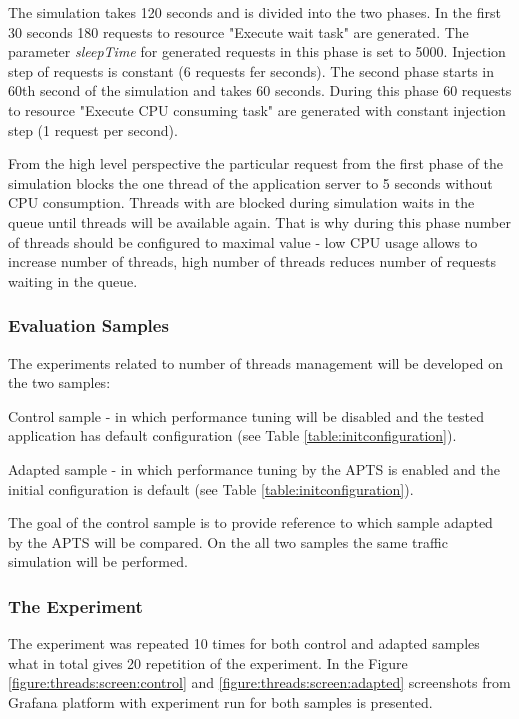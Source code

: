 \documentclass[10pt,a4paper]{article}
\let\tempone\itemize
\let\temptwo\enditemize
\renewenvironment{itemize}{\tempone\addtolength{\itemsep}{-0.4\baselineskip}}{\temptwo}
\begin{document}
The simulation takes 120 seconds and is divided into the two phases. In the first 30 seconds 180 requests to resource "Execute wait task" are generated. The parameter \textit{sleepTime} for generated requests in this phase is set to 5000. Injection step of requests is constant (6 requests fer seconds). The second phase starts in 60th second of the simulation and takes 60 seconds. During this phase 60 requests to resource "Execute CPU consuming task" are generated with constant injection step (1 request per second). 

From the high level perspective the particular request from the first phase of the simulation blocks the one thread of the application server to 5 seconds without CPU consumption. Threads with are blocked during simulation waits in the queue until threads will be available again. That is why during this phase number of threads should be configured to maximal value - low CPU usage allows to increase number of threads, high number of threads reduces number of requests waiting in the queue.   

 
\subsubsection{Evaluation Samples}

The experiments related to number of threads management will be developed on the two samples:
\begin{itemize}
\item Control sample - in which performance tuning will be disabled and the tested application has default  configuration (see Table \ref{table:initconfiguration}).  
\item Adapted sample - in which performance tuning by the APTS is enabled and the initial configuration is default (see Table \ref{table:initconfiguration}).
\end{itemize}

The goal of the control sample is to provide reference to which sample adapted by the APTS will be compared. On the all two samples the same traffic simulation will be performed.
 
\subsubsection{The Experiment} 

The experiment was repeated 10 times for both control and adapted samples what in total gives 20 repetition of the experiment. In the Figure \ref{figure:threads:screen:control} and \ref{figure:threads:screen:adapted} screenshots from Grafana platform with experiment run for both samples is presented.
\end{document}
